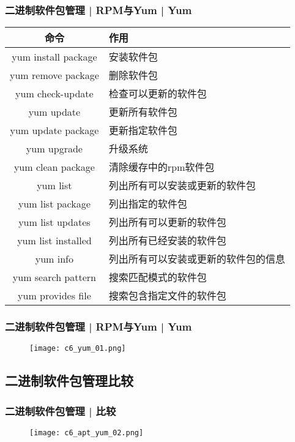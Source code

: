 \begin{frame}
  \frametitle{二进制软件包管理 | RPM与Yum | \alert{Yum}}
  \begin{table}
    \centering
    \begin{tabularx}{\textwidth}{cX}
      \hline
      \rowcolor{blue!50}命令 & 作用\\
      \hline
      yum install package & 安装软件包\\
      yum remove package & 删除软件包\\
      yum check-update & 检查可以更新的软件包\\
      yum update & 更新所有软件包\\
      yum update package & 更新指定软件包\\
      yum upgrade & 升级系统\\
      yum clean package & 清除缓存中的rpm软件包\\
      \hline
      yum list & 列出所有可以安装或更新的软件包\\
      yum list package & 列出指定的软件包\\
      yum list updates & 列出所有可以更新的软件包\\
      yum list installed & 列出所有已经安装的软件包\\
      yum info & 列出所有可以安装或更新的软件包的信息\\
      yum search pattern & 搜索匹配模式的软件包\\
      yum provides file & 搜索包含指定文件的软件包\\
      \hline
    \end{tabularx}
  \end{table}
\end{frame}

\begin{frame}
  \frametitle{二进制软件包管理 | RPM与Yum | Yum}
  \begin{figure}
    \centering
    \texttt{[image: c6\_yum\_01.png]}
  \end{figure}
\end{frame}

\subsection{二进制软件包管理比较}
\begin{frame}
  \frametitle{二进制软件包管理 | 比较}
  \begin{figure}
    \centering
    \texttt{[image: c6\_apt\_yum\_02.png]}
  \end{figure}
\end{frame}

